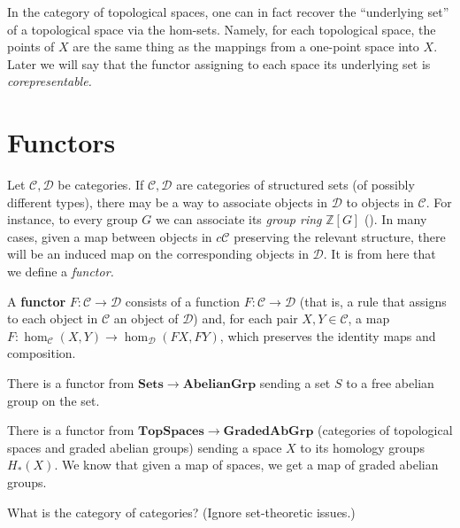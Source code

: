 \begin{example} 
In the category of topological spaces, one can in fact recover the
``underlying set'' of a topological space via the hom-sets. Namely, for each
topological space, the points of $X$ are the same thing as the mappings from a
one-point space into $X$. Later we will say that the functor assigning to each
space its underlying set is \emph{corepresentable.}
\end{example} 

\section{Functors}
Let $\mathcal{C}, \mathcal{D}$ be categories. If $\mathcal{C}, \mathcal{D}$
are categories of structured sets (of possibly different types), there may be a
way to associate objects in $\mathcal{D}$ to objects in $\mathcal{C}$. For
instance, to every group $G$ we can associate its \emph{group ring} $\mathbb{Z}[G]$
 (). 
In many cases, given a map between objects in $c\mathcal{C}$ preserving the
relevant structure, there will be an induced map on the corresponding objects
in $\mathcal{D}$. It is from here that we define a \emph{functor.}

\begin{definition} 
A \textbf{functor} $F: \mathcal{C} \to \mathcal{D}$ consists of a function $F:
\mathcal{C} \to  \mathcal{D}$ (that is, a rule that assigns to each object
in $\mathcal{C}$ an object of $\mathcal{D}$) and, for each pair $X, Y \in \mathcal{C}$,
a map
$F: \hom_{\mathcal{C}}(X, Y) \to \hom_{\mathcal{D}}(FX, FY)$, which preserves the identity
maps and composition. 
\end{definition} 


\begin{example} 
There is a functor from $\mathbf{Sets} \to \mathbf{AbelianGrp}$ sending a set
$S$ to a free abelian group on the set.
\end{example} 

\begin{example} 
There is a functor from $\mathbf{TopSpaces} \to \mathbf{GradedAbGrp}$
(categories of topological spaces and graded abelian groups) sending a
space $X$ to its homology groups $H_*(X)$. We know that given a map of spaces,
we get a map of graded abelian groups. 
\end{example} 

\begin{exercise} 
What is the category of categories? (Ignore set-theoretic issues.)
\end{exercise} 


